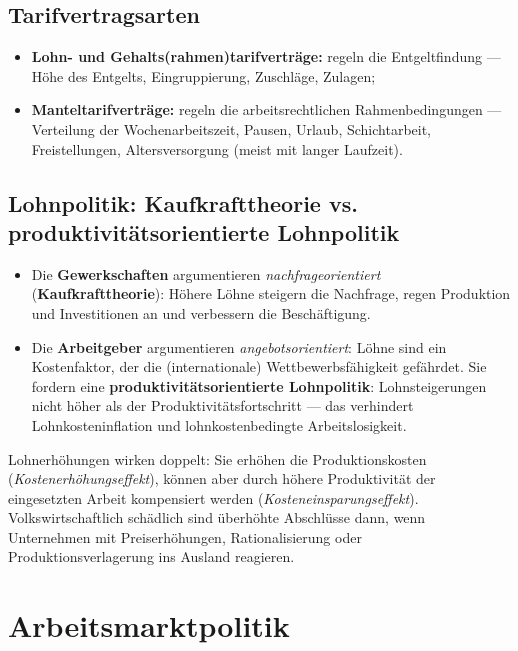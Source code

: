 \documentclass[11pt, a4paper]{article}
\begin{document}
\subsection{Tarifvertragsarten}

\begin{itemize}
  \item \textbf{Lohn- und Gehalts(rahmen)tarifverträge:} regeln die Entgeltfindung ---
    Höhe des Entgelts, Eingruppierung, Zuschläge, Zulagen;
  \item \textbf{Manteltarifverträge:} regeln die arbeitsrechtlichen Rahmenbedingungen ---
    Verteilung der Wochenarbeitszeit, Pausen, Urlaub, Schichtarbeit, Freistellungen,
    Altersversorgung (meist mit langer Laufzeit).
\end{itemize}

\subsection{Lohnpolitik: Kaufkrafttheorie vs. produktivitätsorientierte Lohnpolitik}

\begin{itemize}
  \item Die \textbf{Gewerkschaften} argumentieren \emph{nachfrageorientiert}
    (\textbf{Kaufkrafttheorie}): Höhere Löhne steigern die Nachfrage, regen Produktion und
    Investitionen an und verbessern die Beschäftigung.
  \item Die \textbf{Arbeitgeber} argumentieren \emph{angebotsorientiert}: Löhne sind ein
    Kostenfaktor, der die (internationale) Wettbewerbsfähigkeit gefährdet. Sie fordern eine
    \textbf{produktivitätsorientierte Lohnpolitik}: Lohnsteigerungen nicht höher als der
    Produktivitätsfortschritt --- das verhindert Lohnkosteninflation und lohnkostenbedingte
    Arbeitslosigkeit.
\end{itemize}

Lohnerhöhungen wirken doppelt: Sie erhöhen die Produktionskosten
(\emph{Kostenerhöhungseffekt}), können aber durch höhere Produktivität der eingesetzten
Arbeit kompensiert werden (\emph{Kosteneinsparungseffekt}). Volkswirtschaftlich schädlich
sind überhöhte Abschlüsse dann, wenn Unternehmen mit Preiserhöhungen, Rationalisierung oder
Produktionsverlagerung ins Ausland reagieren.

\section{Arbeitsmarktpolitik}
\end{document}
